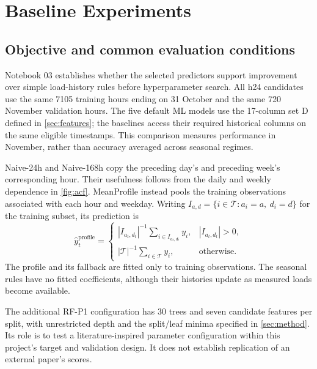 \section{Baseline Experiments}\label{sec:baseline}
\subsection{Objective and common evaluation conditions}
Notebook 03 establishes whether the selected predictors support improvement over simple load-history rules before hyperparameter search. All h24 candidates use the same \num{7105} training hours ending on 31 October and the same 720 November validation hours. The five default ML models use the 17-column set D defined in \cref{sec:features}; the baselines access their required historical columns on the same eligible timestamps. This comparison measures performance in November, rather than accuracy averaged across seasonal regimes.

Naive-24h and Naive-168h copy the preceding day's and preceding week's corresponding hour. Their usefulness follows from the daily and weekly dependence in \cref{fig:acf}. MeanProfile instead pools the training observations associated with each hour and weekday. Writing $I_{a,d}=\{i\in\mathcal T:a_i=a,\ d_i=d\}$ for the training subset, its prediction is
\begin{equation}
\widehat y_t^{\mathrm{profile}}=\begin{cases}
|I_{a_t,d_t}|^{-1}\displaystyle\sum_{i\in I_{a_t,d_t}}y_i,&|I_{a_t,d_t}|>0,\\
|\mathcal T|^{-1}\displaystyle\sum_{i\in\mathcal T}y_i,&\text{otherwise}.
\end{cases}\label{eq:meanprofile}
\end{equation}
The profile and its fallback are fitted only to training observations. The seasonal rules have no fitted coefficients, although their histories update as measured loads become available.

The additional RF-P1 configuration has 30 trees and seven candidate features per split, with unrestricted depth and the split/leaf minima specified in \cref{sec:method}. Its role is to test a literature-inspired parameter configuration within this project's target and validation design. It does not establish replication of an external paper's scores.

